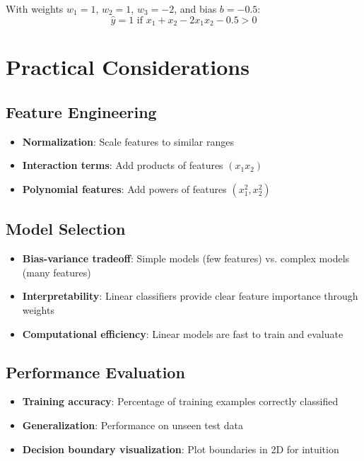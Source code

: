 With weights $w_1 = 1$, $w_2 = 1$, $w_3 = -2$, and bias $b = -0.5$:
\begin{equation}
\hat{y} = 1 \text{ if } x_1 + x_2 - 2x_1x_2 - 0.5 > 0
\end{equation}

\section{Practical Considerations}

\subsection{Feature Engineering}
\begin{itemize}
    \item \textbf{Normalization}: Scale features to similar ranges
    \item \textbf{Interaction terms}: Add products of features $(x_1 x_2)$
    \item \textbf{Polynomial features}: Add powers of features $(x_1^2, x_2^2)$
\end{itemize}

\subsection{Model Selection}
\begin{itemize}
    \item \textbf{Bias-variance tradeoff}: Simple models (few features) vs. complex models (many features)
    \item \textbf{Interpretability}: Linear classifiers provide clear feature importance through weights
    \item \textbf{Computational efficiency}: Linear models are fast to train and evaluate
\end{itemize}

\subsection{Performance Evaluation}
\begin{itemize}
    \item \textbf{Training accuracy}: Percentage of training examples correctly classified
    \item \textbf{Generalization}: Performance on unseen test data
    \item \textbf{Decision boundary visualization}: Plot boundaries in 2D for intuition
\end{itemize}

